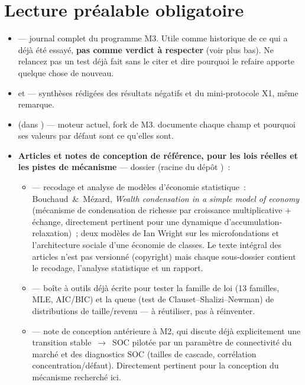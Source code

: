 \section*{Lecture préalable obligatoire}

\begin{itemize}[leftmargin=*]
  \item {} — journal complet du programme M3.
    Utile comme historique de ce qui a déjà été essayé, \textbf{pas comme
    verdict à respecter} (voir plus bas). Ne relancez pas un test déjà fait
    sans le citer et dire pourquoi le refaire apporte quelque chose de
    nouveau.
  \item {} et
     — synthèses rédigées des
    résultats négatifs et du mini-protocole X1, même remarque.
  \item {} (dans \Workspace{}) — moteur actuel, fork de M3.
     documente chaque champ et pourquoi ses valeurs par
    défaut sont ce qu'elles sont.
  \item \textbf{Articles et notes de conception de référence, pour les lois
    réelles et les pistes de mécanisme} — dossier
     (racine du dépôt )~:
    \begin{itemize}
      \item {} — recodage et analyse de
        modèles d'économie statistique~: Bouchaud~\&~Mézard, \emph{Wealth
        condensation in a simple model of economy} (mécanisme de
        condensation de richesse par croissance multiplicative + échange,
        directement pertinent pour une dynamique d'accumulation-relaxation)~;
        deux modèles de Ian Wright sur les microfondations et l'architecture
        sociale d'une économie de classes. Le texte intégral des articles
        n'est pas versionné (copyright) mais chaque sous-dossier contient
        le recodage, l'analyse statistique et un rapport.
      \item {} —
        boîte à outils déjà écrite pour tester la famille de loi (13
        familles, MLE, AIC/BIC) et la queue (test de Clauset--Shalizi--Newman)
        de distributions de taille/revenu — à réutiliser, pas à réinventer.
      \item {} — note de
        conception antérieure à M2, qui discute déjà explicitement une
        transition stable~$\to$~SOC pilotée par un paramètre de connectivité
        du marché et des diagnostics SOC (tailles de cascade, corrélation
        concentration/défaut). Directement pertinent pour la conception du
        mécanisme recherché ici.
    \end{itemize}
\end{itemize}

